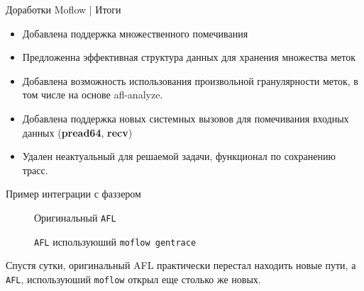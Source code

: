 \documentclass[10pt]{beamer}
\begin{document}
\begin{frame}{Доработки Moflow | Итоги}
\begin{itemize}
 \item Добавлена поддержка множественного помечивания
 \item Предложенна эффективная структура данных для хранения множества меток
 \item Добавлена возможность использования произвольной гранулярности меток, в том числе на основе afl-analyze.
 \item Добавлена поддержка новых системных вызовов для помечивания входных данных (\textbf{pread64}, \textbf{recv})
 \item Удален неактуальный для решаемой задачи, функционал по сохранению трасс.

\end{itemize}
\end{frame}

\begin{frame}{Пример интеграции с фаззером}
\begin{figure}[H]
    \caption{\tiny{Оригинальный \texttt{AFL}}}
\end{figure}
\begin{figure}[H]
      \caption{\tiny{\texttt{AFL} используюший \texttt{moflow gentrace}}}
\end{figure}
  \small{Спустя сутки, оригинальный AFL практически перестал находить новые пути, а \texttt{AFL}, используюший \texttt{moflow} открыл еще столько же новых}.
\end{frame}
\end{document}
